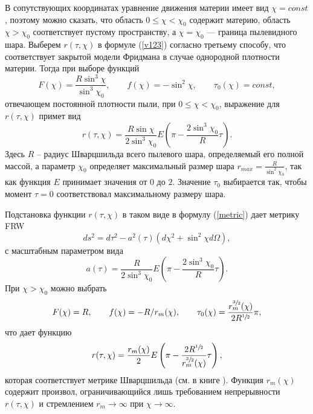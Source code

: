 \documentclass[12pt]{article}
\newcommand{\bq}{\begin{equation}}
\newcommand{\eq}{\end{equation}}
\begin{document}
В сопутствующих координатах уравнение движения материи имеет вид $\chi = const$, поэтому можно сказать, что область $0 \leqslant \chi < \chi_0$ содержит материю, область $\chi > \chi_0$ соответствует пустому пространству, а $\chi = \chi_0$ --- граница пылевидного шара.
Выберем $r(\tau, \chi)$ в формуле (\ref{v123}) согласно третьему способу, что соответствует закрытой модели Фридмана в случае однородной плотности материи.
Тогда при выборе функций 
\bq
F(\chi) = \frac{R \sin^3{\chi}}{\sin^3{\chi_0}}, \qquad f(\chi) = -\sin^2{\chi}, \qquad \tau_0(\chi) = const,
\eq
отвечающем постоянной плотности пыли, при $0 \leqslant \chi < \chi_0$, выражение для $r(\tau, \chi)$ примет вид
\bq
	r(\tau, \chi) = \frac{R \sin{\chi}}{2 \sin^3{\chi_0}}  E \left( \pi - \frac{2 \sin^3{\chi_0}}{R} \tau \right).
\eq
Здесь $R$ -- радиус Шварцшильда всего пылевого шара, определяемый его полной массой, а 
параметр $\chi_0$ определяет максимальный размер шара $r_{max} = \frac{R}{\sin^2{\chi_0}}$, так как функция $E$ принимает значения от $0$ до $2$. Значение $\tau_0$ выбирается так, чтобы момент $\tau = 0$ соответствовал максимальному размеру шара. 

Подстановка функции $r(\tau, \chi)$ в таком виде в формулу (\ref{metric}) дает метрику FRW
\bq
ds^2 = d\tau^2 - a^2(\tau) \left(d\chi^2 + \sin^2{\chi}d\Omega \right),
\eq
с масштабным параметром вида
\bq
a(\tau) = \frac{R}{2 \sin^3{\chi_0}} E \left( \pi - \frac{2 \sin^3{\chi_0}}{R} \tau \right).
\eq
При $\chi > \chi_0$ можно выбрать 
\bq
F(\chi) = R, \qquad f(\chi) = -R/r_m(\chi), \qquad \tau_0(\chi) = \frac{r_m^{\sfrac{3}{2}}(\chi)}{2 R^{\sfrac{1}{2}}} \pi,
\eq
что дает функцию
\bq
r(\tau, \chi) = \frac{r_m(\chi)}{2} E \left( \pi - \frac{2R^{\sfrac{1}{2}}}{r^{\sfrac{3}{2}}_m(\chi)} \tau \right),
\eq
которая соответствует метрике Шварцшильда (см. в книге \cite{landavshic2,novfrol}).
Функция $r_m(\chi)$ содержит произвол, ограничивающийся лишь требованием непрерывности $r(\tau, \chi)$ и стремлением $r_m \to \infty$ при $\chi \to \infty$.
\end{document}
